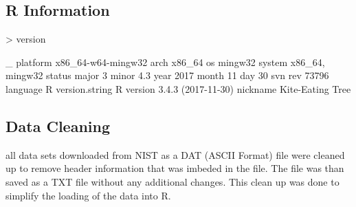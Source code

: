 \documentclass[10pt]{article}
\begin{document}
\subsection{R Information}
\begin{Schunk}
\begin{Sinput}
> version
\end{Sinput}
\begin{Soutput}
               _                           
platform       x86_64-w64-mingw32          
arch           x86_64                      
os             mingw32                     
system         x86_64, mingw32             
status                                     
major          3                           
minor          4.3                         
year           2017                        
month          11                          
day            30                          
svn rev        73796                       
language       R                           
version.string R version 3.4.3 (2017-11-30)
nickname       Kite-Eating Tree            
\end{Soutput}
\end{Schunk}

\subsection{Data Cleaning}
all data sets downloaded from NIST as a DAT (ASCII Format) file were cleaned up 
to remove header information that was imbeded in the file. The file was than saved
as a TXT file without any additional changes. This clean up was done to simplify 
the loading of the data into R.
\end{document}
